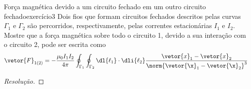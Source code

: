 \begin{exercício}{Força magnética devido a um circuito fechado em um outro circuito fechado}{exercício3}
    Dois fios que formam circuitos fechados descritos pelas curvas \(\Gamma_1\) e \(\Gamma_2\) são percorridos, respectivamente, pelas correntes estacionárias \(I_1\) e \(I_2\).
    Mostre que a força magnética sobre todo o circuito 1, devido a sua interação com o circuito 2, pode ser escrita como
    \begin{equation*}
        \vetor{F}_{1(2)} =-\frac{\mu_0 I_1 I_2}{4\pi} \oint_{\Gamma_1}\oint_{\Gamma_2}{\dl{\ell_1}\cdot \dli{\ell_2} \frac{\vetor{x}_1 - \vetor{x}_2}{\norm{\vetor{\x}_1 - \vetor{\x}_2}^3}}
    \end{equation*}
\end{exercício}
\begin{proof}[Resolução]

\end{proof}
